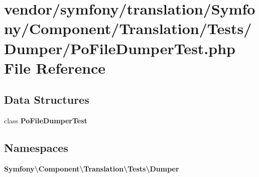 \section{vendor/symfony/translation/\+Symfony/\+Component/\+Translation/\+Tests/\+Dumper/\+Po\+File\+Dumper\+Test.php File Reference}
\label{_po_file_dumper_test_8php}
\subsection*{Data Structures}
\begin{DoxyCompactItemize}
\item 
class {\bf Po\+File\+Dumper\+Test}
\end{DoxyCompactItemize}
\subsection*{Namespaces}
\begin{DoxyCompactItemize}
\item 
 {\bf Symfony\textbackslash{}\+Component\textbackslash{}\+Translation\textbackslash{}\+Tests\textbackslash{}\+Dumper}
\end{DoxyCompactItemize}
